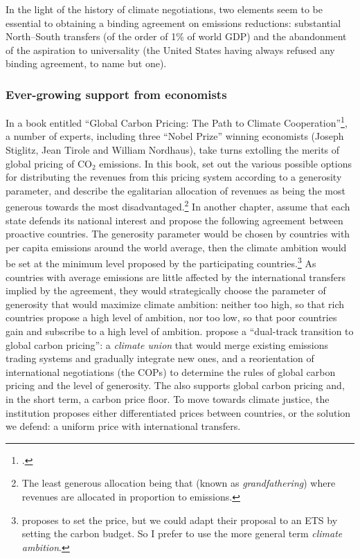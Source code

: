 \documentclass[a5paper,english,openany]{memoir}
\begin{document}
In the light of the history of climate negotiations, two elements seem to be essential to obtaining a binding agreement on emissions reductions: substantial North--South transfers (of the order of 1\% of world GDP) and the abandonment of the aspiration to universality (the United States having always refused any binding agreement, to name but one).

\subsubsection{Ever-growing support from economists}
In a book entitled ``Global Carbon Pricing: The Path to Climate Cooperation''\footnote{\citet{cramton_global_2017}.}, a number of experts, including three ``Nobel Prize'' winning economists (Joseph Stiglitz, Jean Tirole and William Nordhaus), take turns extolling the merits of global pricing of CO$_\text{2}$ emissions. In this book, \citet{gollier_negotiating_2015} set out the various possible options for distributing the revenues from this pricing system according to a generosity parameter, and describe the egalitarian allocation of revenues as being the most generous towards the most disadvantaged.\footnote{The least generous allocation being that (known as \textit{grandfathering}) where revenues are allocated in proportion to emissions.} 
In another chapter, \citet{cramton_international_2015} assume that each state defends its national interest and propose the following agreement between proactive countries. %
The generosity parameter would be chosen by countries with per capita emissions around the world average, then the climate ambition would be set at the minimum level proposed by the participating countries.\footnote{\citet{cramton_international_2015} proposes to set the price, but we could adapt their proposal to an ETS by setting the carbon budget. So I prefer to use the more general term \textit{climate ambition}.} As countries with average emissions are little affected by the international transfers implied by the agreement, they would strategically choose the parameter of generosity that would maximize climate ambition: neither too high, so that rich countries propose a high level of ambition, nor too low, so that poor countries gain and subscribe to a high level of ambition. \citet{van_den_bergh_dual-track_2020} propose a ``dual-track transition to global carbon pricing'': a \textit{climate union} that would merge existing emissions trading systems and gradually integrate new ones, and a reorientation of international negotiations (the COPs) to determine the rules of global carbon pricing and the level of generosity. The \citet{imf_how_2019} also supports global carbon pricing and, in the short term, a carbon price floor. To move towards climate justice, the institution proposes either differentiated prices between countries, or the solution we defend: a uniform price with international transfers. 
\end{document}
